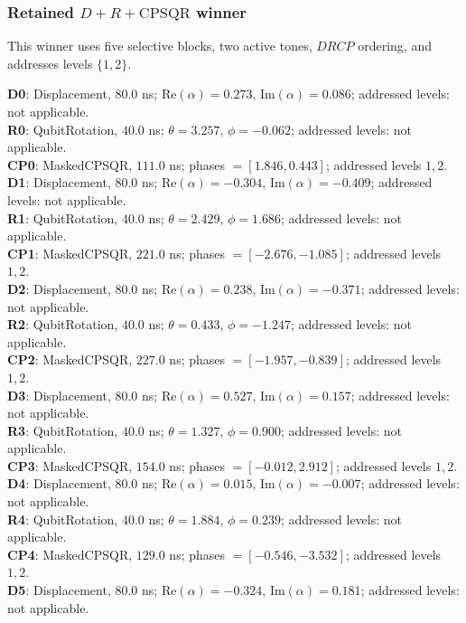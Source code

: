 ﻿\documentclass[aps,pra,twocolumn,reprint,amsmath,amssymb,floatfix]{revtex4-2}
\begin{document}
\subsubsection{Retained $D+R+\mathrm{CPSQR}$ winner}

This winner uses five selective blocks, two active tones, $DRCP$ ordering, and
addresses levels $\{1,2\}$.

{\small
\begin{flushleft}
\textbf{D0}: Displacement, $80.0$ ns; $\mathrm{Re}(\alpha)=0.273$, $\mathrm{Im}(\alpha)=0.086$; addressed levels: not applicable.\\
\textbf{R0}: QubitRotation, $40.0$ ns; $\theta=3.257$, $\phi=-0.062$; addressed levels: not applicable.\\
\textbf{CP0}: MaskedCPSQR, $111.0$ ns; phases $=[1.846,0.443]$; addressed levels $1,2$.\\
\textbf{D1}: Displacement, $80.0$ ns; $\mathrm{Re}(\alpha)=-0.304$, $\mathrm{Im}(\alpha)=-0.409$; addressed levels: not applicable.\\
\textbf{R1}: QubitRotation, $40.0$ ns; $\theta=2.429$, $\phi=1.686$; addressed levels: not applicable.\\
\textbf{CP1}: MaskedCPSQR, $221.0$ ns; phases $=[-2.676,-1.085]$; addressed levels $1,2$.\\
\textbf{D2}: Displacement, $80.0$ ns; $\mathrm{Re}(\alpha)=0.238$, $\mathrm{Im}(\alpha)=-0.371$; addressed levels: not applicable.\\
\textbf{R2}: QubitRotation, $40.0$ ns; $\theta=0.433$, $\phi=-1.247$; addressed levels: not applicable.\\
\textbf{CP2}: MaskedCPSQR, $227.0$ ns; phases $=[-1.957,-0.839]$; addressed levels $1,2$.\\
\textbf{D3}: Displacement, $80.0$ ns; $\mathrm{Re}(\alpha)=0.527$, $\mathrm{Im}(\alpha)=0.157$; addressed levels: not applicable.\\
\textbf{R3}: QubitRotation, $40.0$ ns; $\theta=1.327$, $\phi=0.900$; addressed levels: not applicable.\\
\textbf{CP3}: MaskedCPSQR, $154.0$ ns; phases $=[-0.012,2.912]$; addressed levels $1,2$.\\
\textbf{D4}: Displacement, $80.0$ ns; $\mathrm{Re}(\alpha)=0.015$, $\mathrm{Im}(\alpha)=-0.007$; addressed levels: not applicable.\\
\textbf{R4}: QubitRotation, $40.0$ ns; $\theta=1.884$, $\phi=0.239$; addressed levels: not applicable.\\
\textbf{CP4}: MaskedCPSQR, $129.0$ ns; phases $=[-0.546,-3.532]$; addressed levels $1,2$.\\
\textbf{D5}: Displacement, $80.0$ ns; $\mathrm{Re}(\alpha)=-0.324$, $\mathrm{Im}(\alpha)=0.181$; addressed levels: not applicable.
\end{flushleft}
}
\end{document}

